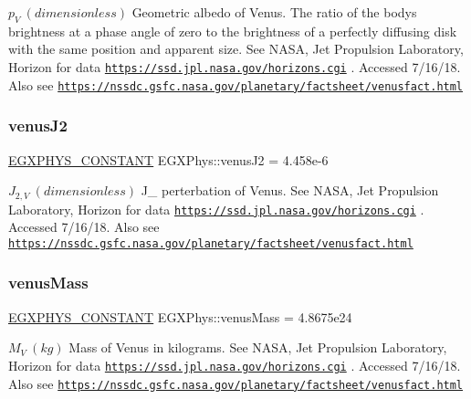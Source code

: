$ p_{V} \ (dimensionless)$ Geometric albedo of Venus. The ratio of the body\textquotesingle{}s brightness at a phase angle of zero to the brightness of a perfectly diffusing disk with the same position and apparent size. See N\+A\+SA, Jet Propulsion Laboratory, Horizon for data \href{https://ssd.jpl.nasa.gov/horizons.cgi}{\tt https\+://ssd.\+jpl.\+nasa.\+gov/horizons.\+cgi} . Accessed 7/16/18. Also see \href{https://nssdc.gsfc.nasa.gov/planetary/factsheet/venusfact.html}{\tt https\+://nssdc.\+gsfc.\+nasa.\+gov/planetary/factsheet/venusfact.\+html} \mbox{\label{group___e_g_x_phys-_constants-_astrophysics-_solar_system-_venus-_bulk_ga7cb8b494f46eb7bdf8bbe4a4d61bb53e}} 
\subsubsection{\texorpdfstring{venus\+J2}{venusJ2}}
{\footnotesize\ttfamily \mbox{\hyperlink{group___e_g_x_phys-_constants-_macros_ga76980d288494ce1714c9ac68a95ba702}{E\+G\+X\+P\+H\+Y\+S\+\_\+\+C\+O\+N\+S\+T\+A\+NT}} E\+G\+X\+Phys\+::venus\+J2 = 4.\+458e-\/6}

$ J_{2,V} \ (dimensionless)$ J\+\_ perterbation of Venus. See N\+A\+SA, Jet Propulsion Laboratory, Horizon for data \href{https://ssd.jpl.nasa.gov/horizons.cgi}{\tt https\+://ssd.\+jpl.\+nasa.\+gov/horizons.\+cgi} . Accessed 7/16/18. Also see \href{https://nssdc.gsfc.nasa.gov/planetary/factsheet/venusfact.html}{\tt https\+://nssdc.\+gsfc.\+nasa.\+gov/planetary/factsheet/venusfact.\+html} \mbox{\label{group___e_g_x_phys-_constants-_astrophysics-_solar_system-_venus-_bulk_ga5331daa7cd2abe77e1fa8ad9e3534f7d}} 
\subsubsection{\texorpdfstring{venus\+Mass}{venusMass}}
{\footnotesize\ttfamily \mbox{\hyperlink{group___e_g_x_phys-_constants-_macros_ga76980d288494ce1714c9ac68a95ba702}{E\+G\+X\+P\+H\+Y\+S\+\_\+\+C\+O\+N\+S\+T\+A\+NT}} E\+G\+X\+Phys\+::venus\+Mass = 4.\+8675e24}

$M_{V} \ (kg)$ Mass of Venus in kilograms. See N\+A\+SA, Jet Propulsion Laboratory, Horizon for data \href{https://ssd.jpl.nasa.gov/horizons.cgi}{\tt https\+://ssd.\+jpl.\+nasa.\+gov/horizons.\+cgi} . Accessed 7/16/18. Also see \href{https://nssdc.gsfc.nasa.gov/planetary/factsheet/venusfact.html}{\tt https\+://nssdc.\+gsfc.\+nasa.\+gov/planetary/factsheet/venusfact.\+html} \mbox{\label{group___e_g_x_phys-_constants-_astrophysics-_solar_system-_venus-_bulk_gaa3f5213a60c6dfeaf8bd4a770783cd31}} 
